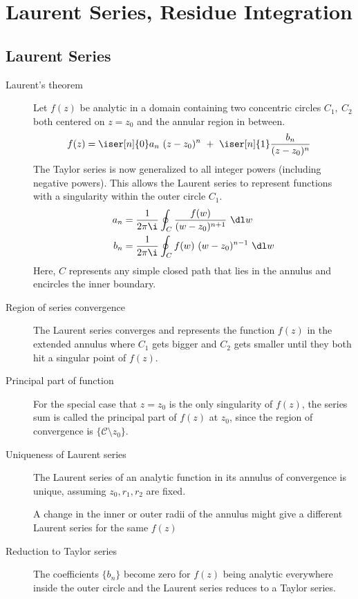 \chapter{Laurent Series, Residue Integration}

\section{Laurent Series}

\begin{description}
    \item[Laurent's theorem] Let $ f(z) $ be analytic in a domain containing two
        concentric circles $ C_1,\ C_2 $ both centered on $ z = z_0 $ and the annular
        region in between.
        \begin{align}
            f(z) & = \iser[n]{0} a_n\ (z - z_0)^n\ +
            \ \iser[n]{1} \frac{b_n}{(z - z_0)^n}
        \end{align}
        The Taylor series is now generalized to all integer powers (including negative
        powers). This allows the Laurent series to represent functions with a
        singularity within the outer circle $ C_1 $.
        \begin{align}
            a_n & = \frac{1}{2\pi \i} \oint_C \frac{f(w)}{(w - z_0)^{n+1}}\ \dl w \\
            b_n & = \frac{1}{2\pi \i} \oint_C f(w)\ (w - z_0)^{n-1}\ \dl w
        \end{align}
        Here, $ C $ represents any simple closed path that lies in the annulus and
        encircles the inner boundary. \par
    \item[Region of series convergence] The Laurent series converges and represents the
        function $ f(z) $ in the extended annulus where $ C_1 $ gets bigger and $ C_2 $
        gets smaller until they both hit a singular point of $ f(z) $.

    \item[Principal part of function] For the special case that $ z = z_0 $ is the
        only singularity of $ f(z) $, the series sum is called the principal part
        of $ f(z) $ at $ z_0 $, since the region of convergence is $ \{\mathcal{C}
            \setminus z_0\} $.

    \item[Uniqueness of Laurent series] The Laurent series of an analytic function in its
        annulus of convergence is unique, assuming $ z_0, r_1, r_2 $ are fixed. \par
        A change in the inner or outer radii of the annulus might give a different Laurent
        series for the same $ f(z) $

    \item[Reduction to Taylor series] The coefficients $\{b_n\}$ become zero for $ f(z) $
        being analytic everywhere inside the outer circle and the Laurent series reduces
        to a Taylor series.
\end{description}

